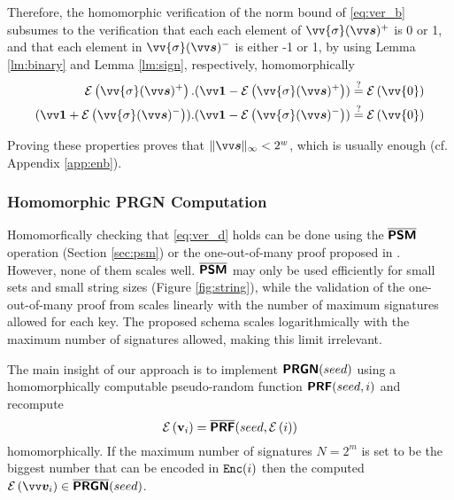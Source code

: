 
Therefore, the homomorphic verification of the norm bound of \cref{eq:ver_b} subsumes to the verification that each each element of $\vv{\sigma}(\pv{s})^+$ is 0 or 1, and that each element in $\vv{\sigma}(\pv{s})^-$ is either -1 or 1, by using Lemma \ref{lm:binary} and Lemma \ref{lm:sign}, respectively, homomorphically
\begin{equation}\label{eq:signbound}
\begin{split}
\enc{\vv{\sigma}(\pv{s})^+}.(\pv{1}-\enc{\vv{\sigma}(\pv{s})^+}) \stackrel{?}{=}\enc{\vv{0}}\\
(\pv{1}+\enc{\vv{\sigma}(\pv{s})^-}).(\pv{1}-\enc{\vv{\sigma}(\pv{s})^-}) \stackrel{?}{=}\enc{\vv{0}} \\ 
\end{split}   
\end{equation}

Proving these properties proves that $\|\pv{s}\|_{\infty}<2^w$, which is usually enough (cf. Appendix \ref{app:enb}).

\subsubsection{Homomorphic PRGN Computation}

Homomorfically checking that \cref{eq:ver_d} holds can be done using the $\overline{\textsf{\textbf{PSM}}}$ operation (Section \ref{sec:psm}) or the one-out-of-many proof proposed in \cite{lyubashevskySMILESetMembership2021}. However, none of them scales well. $\overline{\textsf{\textbf{PSM}}}$ may only be used efficiently for small sets and small string sizes (Figure \ref{fig:string}), while the validation of the one-out-of-many proof from \cite{lyubashevskySMILESetMembership2021} scales linearly with the number of maximum signatures allowed for each key. The proposed schema scales logarithmically with the maximum number of signatures allowed, making this limit irrelevant.

The main insight of our approach is to implement $\textsf{\textbf{PRGN}}(seed)$ using a homomorphically computable pseudo-random function $\textsf{\textbf{PRF}}(seed,i)$ and recompute
\begin{equation}\label{eq:prf}
\mathcal{E}\left({\mathbf{v}_i}\right)=\overline{\textsf{\textbf{PRF}}}(seed,\mathcal{E}\left({i}\right))
\end{equation}
homomorphically. If the maximum number of signatures $N = 2^m$ is set to be the biggest number that can be encoded in $\mathtt{Enc}(i)$ then the computed $\enc{\pv{v}_i} \in \overline{\PRGN}(seed)$.


